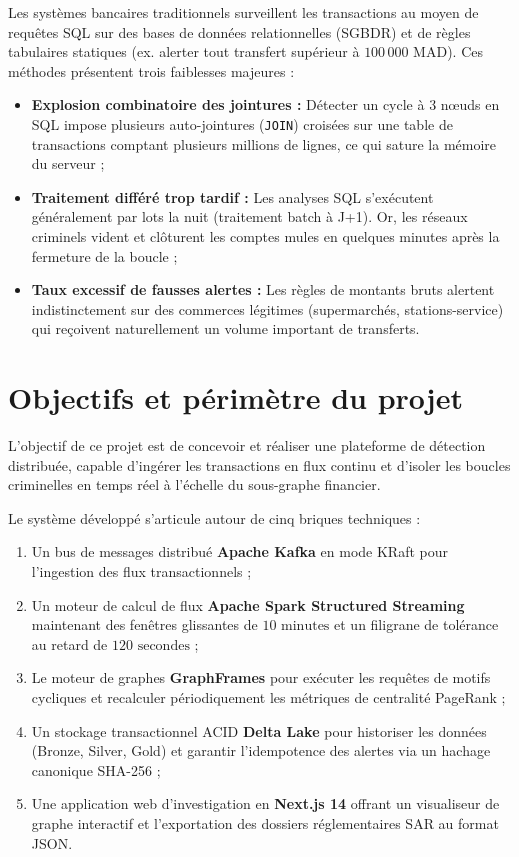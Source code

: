 Les systèmes bancaires traditionnels surveillent les transactions au moyen de requêtes SQL sur des bases de données relationnelles (SGBDR) et de règles tabulaires statiques (ex. alerter tout transfert supérieur à $100\,000\text{ MAD}$). Ces méthodes présentent trois faiblesses majeures :
\begin{itemize}
    \item \textbf{Explosion combinatoire des jointures :} Détecter un cycle à 3 nœuds en SQL impose plusieurs auto-jointures (\texttt{JOIN}) croisées sur une table de transactions comptant plusieurs millions de lignes, ce qui sature la mémoire du serveur ;
    \item \textbf{Traitement différé trop tardif :} Les analyses SQL s'exécutent généralement par lots la nuit (traitement batch à J+1). Or, les réseaux criminels vident et clôturent les comptes mules en quelques minutes après la fermeture de la boucle ;
    \item \textbf{Taux excessif de fausses alertes :} Les règles de montants bruts alertent indistinctement sur des commerces légitimes (supermarchés, stations-service) qui reçoivent naturellement un volume important de transferts.
\end{itemize}

\section{Objectifs et périmètre du projet}

L'objectif de ce projet est de concevoir et réaliser une plateforme de détection distribuée, capable d'ingérer les transactions en flux continu et d'isoler les boucles criminelles en temps réel à l'échelle du sous-graphe financier.

Le système développé s'articule autour de cinq briques techniques :
\begin{enumerate}
    \item Un bus de messages distribué \textbf{Apache Kafka} en mode KRaft pour l'ingestion des flux transactionnels ;
    \item Un moteur de calcul de flux \textbf{Apache Spark Structured Streaming} maintenant des fenêtres glissantes de $10\text{ minutes}$ et un filigrane de tolérance au retard de $120\text{ secondes}$ ;
    \item Le moteur de graphes \textbf{GraphFrames} pour exécuter les requêtes de motifs cycliques et recalculer périodiquement les métriques de centralité PageRank ;
    \item Un stockage transactionnel ACID \textbf{Delta Lake} pour historiser les données (Bronze, Silver, Gold) et garantir l'idempotence des alertes via un hachage canonique SHA-256 ;
    \item Une application web d'investigation en \textbf{Next.js 14} offrant un visualiseur de graphe interactif et l'exportation des dossiers réglementaires SAR au format JSON.
\end{enumerate}

